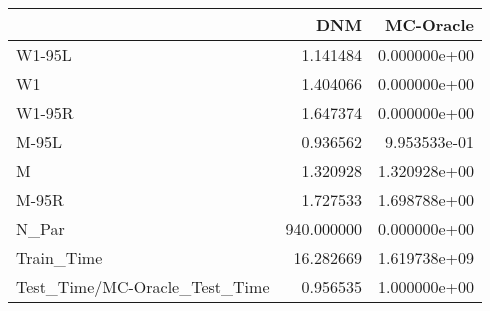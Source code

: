 \begin{tabular}{lrr}
\toprule
{} &         DNM &     MC-Oracle \\
\midrule
W1-95L                        &    1.141484 &  0.000000e+00 \\
W1                            &    1.404066 &  0.000000e+00 \\
W1-95R                        &    1.647374 &  0.000000e+00 \\
M-95L                         &    0.936562 &  9.953533e-01 \\
M                             &    1.320928 &  1.320928e+00 \\
M-95R                         &    1.727533 &  1.698788e+00 \\
N\_Par                         &  940.000000 &  0.000000e+00 \\
Train\_Time                    &   16.282669 &  1.619738e+09 \\
Test\_Time/MC-Oracle\_Test\_Time &    0.956535 &  1.000000e+00 \\
\bottomrule
\end{tabular}
